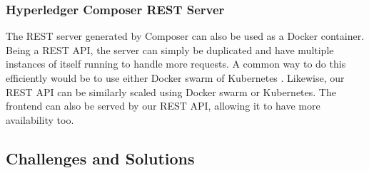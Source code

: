 \documentclass[11pt,journal]{IEEEtran}
\begin{document}
\subsubsection{Hyperledger Composer REST Server}

The REST server generated by Composer can also be used as a Docker container. Being a REST API, the server can simply be duplicated and have multiple instances of itself running to handle more requests. A common way to do this efficiently would be to use either Docker swarm \cite{DockerSwarm:online} of Kubernetes \cite{K8s:online}. Likewise, our REST API can be similarly scaled using Docker swarm or Kubernetes. The frontend can also be served by our REST API, allowing it to have more availability too. 


\subsection{Challenges and Solutions} \label{sec:challenges}
\end{document}
